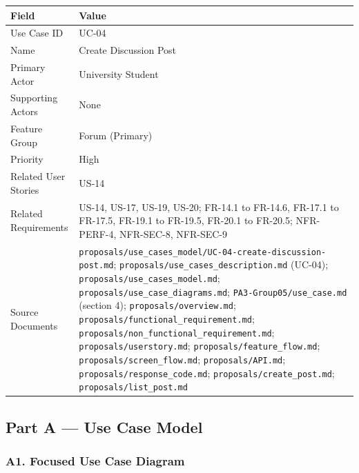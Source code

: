 \documentclass[12pt]{article}
\renewcommand{\baselinestretch}{1.5}
\begin{document}
\begingroup
\small
\renewcommand{\baselinestretch}{1.0}\selectfont
\renewcommand{\arraystretch}{1.15}
\setlength{\tabcolsep}{6pt}
\begin{longtable}{|>{\raggedright\arraybackslash}p{}|>{\raggedright\arraybackslash}p{}|}
\hline
\textbf{Field} & \textbf{Value} \\ \hline
\endhead
Use Case ID & UC-04 \\ \hline
Name & Create Discussion Post \\ \hline
Primary Actor & University Student \\ \hline
Supporting Actors & None \\ \hline
Feature Group & Forum (Primary) \\ \hline
Priority & High \\ \hline
Related User Stories & US-14 \\ \hline
Related Requirements & US-14, US-17, US-19, US-20; FR-14.1 to FR-14.6, FR-17.1 to FR-17.5, FR-19.1 to FR-19.5, FR-20.1 to FR-20.5; NFR-PERF-4, NFR-SEC-8, NFR-SEC-9 \\ \hline
Source Documents & \texttt{proposals/use\_cases\_model/UC-04-create-discussion-post.md}; \texttt{proposals/use\_cases\_description.md} (UC-04); \texttt{proposals/use\_cases\_model.md}; \texttt{proposals/use\_case\_diagrams.md}; \texttt{PA3-Group05/use\_case.md} (section 4); \texttt{proposals/overview.md}; \texttt{proposals/functional\_requirement.md}; \texttt{proposals/non\_functional\_requirement.md}; \texttt{proposals/userstory.md}; \texttt{proposals/feature\_flow.md}; \texttt{proposals/screen\_flow.md}; \texttt{proposals/API.md}; \texttt{proposals/response\_code.md}; \texttt{proposals/create\_post.md}; \texttt{proposals/list\_post.md} \\ \hline
\end{longtable}
\endgroup
\par\medskip

\hypertarget{sec:part-a-use-case-model}{}
\subsection*{Part A --- Use Case Model}
\par\medskip

\hypertarget{sec:a1-focused-use-case-diagram}{}
\subsubsection*{A1. Focused Use Case Diagram}
\par\medskip
\end{document}
